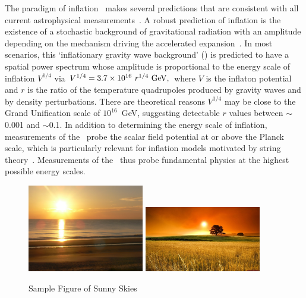 The paradigm of inflation~\cite{guth81,linde82,albrecht82,sato81,kolb94}
makes several predictions that are consistent with all current astrophysical 
measurements~\cite{spergel06,Tegmark:2006az,planck2015parameters,planck2015inflation}. 
A robust prediction of inflation is the existence of a stochastic background of gravitational radiation 
with an amplitude depending on the mechanism driving the accelerated 
expansion~\cite{starobinsky82,starobinsky83a,rubakov82,grishchuk75,abbott84a}.
In most scenarios, this `inflationary gravity wave background' (\igb) is predicted
to have a spatial power spectrum whose amplitude is proportional to the energy
scale of inflation $V^{1/4}$ via
$V^{1/4} = 3.7 \times 10^{16} \ r^{1/4}\,\, {\rm GeV},$
where $V$ is the inflaton potential and $r$ is the ratio of the temperature
quadrupoles produced by gravity waves and by density perturbations.  
There are theoretical reasons $V^{1/4}$ may be close to the Grand
Unification scale of $10^{16}$~GeV, suggesting detectable $r$ values between 
$\sim$0.001 and $\sim$0.1. In addition to determining the energy scale of inflation, measurements 
of the \igb\ probe the scalar field potential at or above the Planck scale, which is particularly relevant for inflation models motivated 
by string theory~\cite{SnowmassInflationTheory}. Measurements of the \igb\ thus probe fundamental physics at the 
highest possible energy scales. 
\begin{figure}[htbp!]
\hspace{0.in}
\parbox{4.2in}{ \centerline {
\includegraphics[width=2.0in] {Figures/sunny_skies.jpg}  
\hspace{0.1in}
\includegraphics[width=2.0in] {Figures/sunny_skies2.jpg}  }  }
\hspace{0.1in}
\parbox{2.in}{
\caption{ \small \setlength{\baselineskip}{0.90\baselineskip}
       Sample Figure of Sunny Skies
\label{fig:sunny_skies} } }   
\vspace{-0.05in}
\end{figure}

